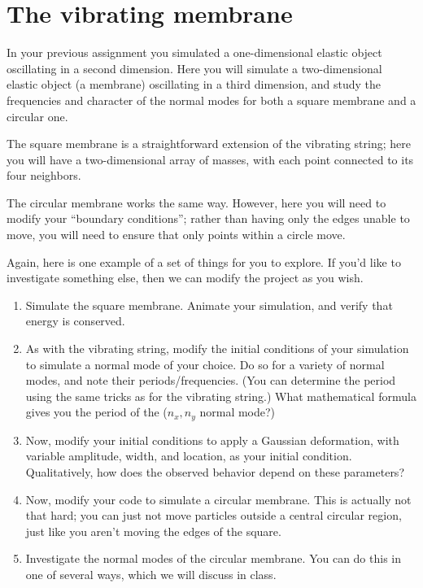 \documentclass[12pt]{article}
\begin{document}
\section{The vibrating membrane}

In your previous assignment you simulated a one-dimensional elastic object oscillating in a second dimension. Here you will simulate a two-dimensional elastic object (a membrane) oscillating in a third dimension, and study the frequencies and character of the normal modes for both a square membrane and a circular one.

The square membrane is a straightforward extension of the vibrating string; here you will have a two-dimensional array of masses, with each point connected to its four neighbors.

The circular membrane works the same way. However, here you will need to modify your ``boundary conditions''; rather than having only the edges unable to move, you will need to ensure that only points within a circle move.  

Again, here is one example of a set of things for you to explore. If you'd like to investigate something else, then we can modify the project as you wish.

\begin{enumerate}
  \item{Simulate the square membrane. Animate your simulation, and verify that energy is conserved.}

  \item{As with the vibrating string, modify the initial conditions of your simulation to simulate a normal mode of your choice. Do so for a variety of normal modes, and note their periods/frequencies. (You can determine the period using the same tricks as for the vibrating string.) What mathematical formula
        gives you the period of the ($n_x,n_y$ normal mode?)}

  \item{Now, modify your initial conditions to apply a Gaussian deformation, with variable amplitude, width, and location, as your initial condition. Qualitatively, how does the observed behavior depend on these parameters?}

  \item{Now, modify your code to simulate a circular membrane. This is actually not that hard; you can just not move particles outside a central circular region, just like you aren't moving the edges of the square.}

  \item{Investigate the normal modes of the circular membrane. You can do this in one of several ways, which we will discuss in class.}
    
\end{enumerate}
\end{document}
